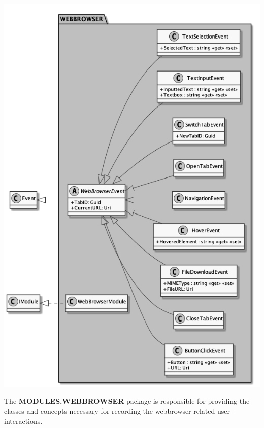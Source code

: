 \begin{center}
    \includegraphics[width=1.0\textwidth]{resources/Packages/MODULES_WEBBROWSER.png}
\end{center}

The \textbf{MODULES.WEBBROWSER} package is responsible for providing the classes and concepts necessary for recording the webbrowser related user-interactions.

\begin{packclass}
\end{packclass}

